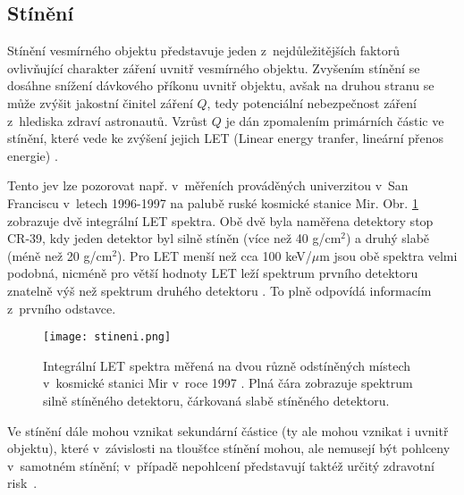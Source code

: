 \subsection{Stínění}\label{sec:kosmickeZareni_stineni}
Stínění vesmírného objektu představuje jeden z~nejdůležitějších faktorů ovlivňující charakter záření uvnitř vesmírného objektu. Zvyšením stínění se dosáhne snížení dávkového příkonu uvnitř objektu, avšak na druhou stranu se může zvýšit jakostní činitel záření $Q$, tedy potenciální nebezpečnost záření z~hlediska zdraví astronautů. Vzrůst $Q$ je dán zpomalením primárních částic ve stínění, které vede ke zvýšení jejich LET (Linear energy tranfer, lineární přenos energie) \cite{toNemecky}.

Tento jev lze pozorovat např. v~měřeních prováděných univerzitou v~San Franciscu v~letech 1996-1997 na palubě ruské kosmické stanice Mir. Obr. \ref{fig:stineni} zobrazuje dvě integrální LET spektra. Obě dvě byla naměřena detektory stop CR-39, kdy jeden detektor byl silně stíněn (více než 40 g/cm$^2$) a druhý slabě (méně než 20 g/cm$^2$). Pro LET menší než cca 100 keV/$\mu$m jsou obě spektra velmi podobná, nicméně pro větší hodnoty LET leží spektrum prvního detektoru znatelně výš než spektrum druhého detektoru \cite{benton}. To plně odpovídá informacím z~prvního odstavce.
\begin{figure}[H]
  \centering
  \texttt{[image: stineni.png]}
  \caption{Integrální LET spektra měřená na dvou různě odstíněných místech v~kosmické stanici Mir v~roce 1997 \cite{benton}. Plná čára zobrazuje spektrum silně stíněného detektoru, čárkovaná slabě stíněného detektoru.}
  \label{fig:stineni}
\end{figure}

Ve stínění dále mohou vznikat sekundární částice (ty ale mohou vznikat i uvnitř objektu), které v~závislosti na tloušťce stínění mohou, ale nemusejí být pohlceny v~samotném stínění; v~případě nepohlcení představují taktéž určitý zdravotní risk~\cite{benton}. 


